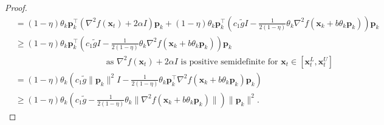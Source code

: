\documentclass{elsarticle}
\numberwithin{equation}{section}
\begin{document}
{\begin{proof}
\begin{align}
        &= (1-\eta)\theta_{k}\mathbf{p}^{\top}_{k}(\nabla^{2} f(\mathbf{x}_{t})+2\alpha I)\mathbf{p}_{k}+(1-\eta)\theta_{k}\mathbf{p}^{\top}_{k}\left(c_1\tilde gI-\frac{1}{2(1-\eta)}\theta_{k}\nabla^{2} f(\mathbf{x}_{k}+b\theta_{k}\mathbf{p}_{k})\right)\mathbf{p}_{k}\nonumber\\
        &\geq (1-\eta) \theta_{k} \mathbf{p}^{\top}_{k} \left(c_1\tilde gI-\frac{1}{2(1-\eta)}\theta_{k}\nabla^{2} f(\mathbf{x}_{k}+b\theta_{k}\mathbf{p}_{k})\right)\mathbf{p}_{k}\nonumber\\
        &~~~~~~~~~~~~~~~~~~~~~~~~~~~~~~~~~~~~~~~~~~~~~~~\text{ as }\nabla^{2} f(\mathbf{x}_{t})+2\alpha I \text{ is positive semidefinite  for }\mathbf{x}_{t}\in[\mathbf{x}^{L}_{t}, \mathbf{x}^{U}_{t}]\nonumber\\
        &=(1-\eta)\theta_{k}\left(c_1\tilde g\lVert \mathbf{p}_{k}\rVert^{2}I-\frac{1}{2(1-\eta)}\theta_{k}\mathbf{p}^{\top}_{k}\nabla^{2}f(\mathbf{x}_{k}+b\theta_{k}\mathbf{p}_{k})\mathbf{p}_{k}\right)\nonumber\\
        &\geq (1-\eta)\theta_{k}\left(c_1\tilde g-\frac{1}{2(1-\eta)}\theta_{k}\rVert\nabla^{2}f(\mathbf{x}_{k}+b\theta_{k}\mathbf{p}_{k})\rVert\right)\lVert \mathbf{p}_{k}\rVert^{2}.
    \end{align}
    

\end{proof}}
\end{document}
